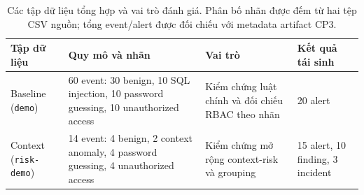 \begin{table}[t]
  \centering
  \small
  \caption{Các tập dữ liệu tổng hợp và vai trò đánh giá. Phân bố nhãn được đếm từ hai tệp CSV nguồn; tổng event/alert được đối chiếu với metadata artifact CP3.}
  \label{tab:dataset-description}
  \begin{tabular}{p{2.0cm}p{2.25cm}p{2.3cm}p{1.7cm}}
    \toprule
    Tập dữ liệu & Quy mô và nhãn & Vai trò & Kết quả tái sinh \\
    \midrule
    Baseline (\texttt{demo}) & 60 event: 30 benign, 10 SQL injection, 10 password guessing, 10 unauthorized access & Kiểm chứng luật chính và đối chiếu RBAC theo nhãn & 20 alert \\
    Context (\texttt{risk-demo}) & 14 event: 4 benign, 2 context anomaly, 4 password guessing, 4 unauthorized access & Kiểm chứng mở rộng context-risk và grouping & 15 alert, 10 finding, 3 incident \\
    \bottomrule
  \end{tabular}
\end{table}
